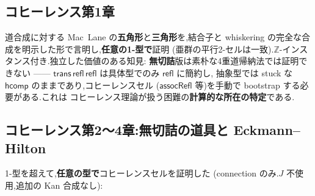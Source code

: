 \documentclass[11pt]{ltjsarticle}
\newcommand{\Z}{\mathbb{Z}}
\newcommand{\op}[1]{\ensuremath{\mathsf{#1}}}
\begin{document}
\subsection{コヒーレンス第1章}
道合成に対する Mac~Lane の\textbf{五角形}と\textbf{三角形}を,結合子と
whiskering の完全な合成を明示した形で言明し,\textbf{任意の1-型で}証明
(亜群の平行2-セルは一致).$\Z$-インスタンス付き.独立した価値のある知見:
\textbf{無切詰}版は素朴な4重道帰納法では証明できない ——
$\op{trans}\,\op{refl}\,\op{refl}$ は具体型でのみ $\op{refl}$ に簡約し,
抽象型では stuck な $\op{hcomp}$ のままであり,コヒーレンスセル
($\op{assocRefl}$ 等)を手動で bootstrap する必要がある.これは
コヒーレンス理論が扱う困難の\textbf{計算的な所在の特定}である.

\subsection{コヒーレンス第2〜4章:無切詰の道具と Eckmann--Hilton}
1-型を超えて,\textbf{任意の型で}コヒーレンスセルを証明した
(connection のみ.$J$ 不使用,追加の Kan 合成なし):
\end{document}
